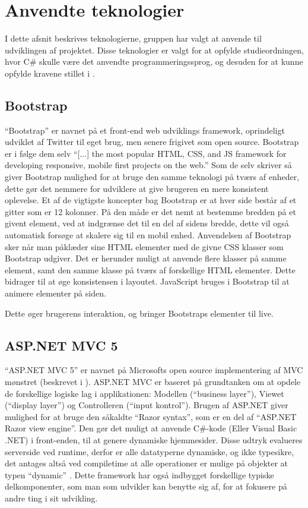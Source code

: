 \section{Anvendte teknologier}
I dette afsnit beskrives teknologierne, gruppen har valgt at anvende til udviklingen af projektet.
Disse teknologier er valgt for at opfylde studieordningen, hvor C\# skulle være det anvendte programmeringssprog, og desuden for at kunne opfylde kravene stillet i .

\subsection{Bootstrap}
``Bootstrap'' er navnet på et front-end web udviklings framework, oprindeligt udviklet af Twitter til eget brug, men senere frigivet som open source.
Bootstrap er i følge dem selv ``[...] the most popular HTML, CSS, and JS framework for developing responsive, mobile first projects on the web.'' \cite{GETBOOTSTRAP}
Som de selv skriver så giver Bootstrap mulighed for at bruge den samme teknologi på tværs af enheder, dette gør det nemmere for udviklere at give brugeren en mere konsistent oplevelse.
Et af de vigtigste koncepter bag Bootstrap er at hver side består af et gitter som er 12 kolonner.
På den måde er det nemt at bestemme bredden på et givent element, ved at indgrænse det til en del af sidens bredde, dette vil også automatisk forsøge at skalere sig til en mobil enhed.
Anvendelsen af Bootstrap sker når man påklæder sine HTML elementer med de givne CSS klasser som Bootstrap udgiver.
Det er herunder muligt at anvende flere klasser på samme element, samt den samme klasse på tværs af forskellige HTML elementer.
Dette bidrager til at øge konsistensen i layoutet.
JavaScript bruges i Bootstrap til at animere elementer på siden.

Dette øger brugerens interaktion, og bringer Bootstraps elementer til live. \cite{GETBOOTSTRAP}

\subsection{ASP.NET MVC 5}\label{aspnet}
``ASP.NET MVC 5'' er navnet på Microsofts open source implementering af MVC mønstret (beskrevet i ).
ASP.NET MVC er baseret på grundtanken om at opdele de forskellige logiske lag i applikationen: Modellen (``business layer''), Viewet (``display layer'') og Controlleren (``input kontrol'').
Brugen af ASP.NET giver mulighed for at bruge den såkaldte ``Razor syntax'', som er en del af ``ASP.NET Razor view engine''.
Den gør det muligt at anvende C\#-kode (Eller Visual Basic .NET) i front-enden, til at genere dynamiske hjemmesider.
Disse udtryk evalueres serverside ved runtime, derfor er alle datatyperne dynamiske, og ikke typesikre, det antages altså ved compiletime at alle operationer er mulige på objekter at typen ``dynamic'' \citep{UsingTypeDynamic}.
Dette framework har også indbygget forskellige typiske delkomponenter, som man som udvikler kan benytte sig af, for at fokusere på andre ting i sit udvikling.

